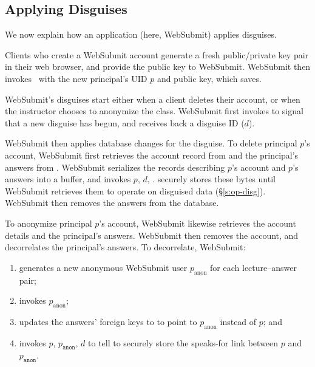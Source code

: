 \subsection{Applying Disguises}
%
We now explain how an application (here, WebSubmit) applies disguises.
%

%
Clients who create a WebSubmit account generate a fresh public/private key pair
in their web browser, and provide the public key to WebSubmit.
%
WebSubmit then invokes  with the new principal's UID $p$
and public key, which \sys saves.
%

%
WebSubmit's disguises start either when a client deletes their account,
or when the instructor chooses to anonymize the class.
%
WebSubmit first invokes  to signal \sys that a new
disguise has begun, and receives back a disguise ID ($d$).
%

%
WebSubmit then applies database changes for the disguise.
%
To delete principal $p$'s account, WebSubmit first retrieves the account record
from  and the principal's answers from .
%
WebSubmit serializes the records describing $p$'s account and $p$'s answers into
a buffer, and invokes $p$, $d$, .
%
\sys securely stores these bytes until WebSubmit retrieves them to operate on
disguised data (\S\ref{s:op-disg}).
%
WebSubmit then removes the answers from the database.
%

%
To anonymize principal $p$'s account, WebSubmit likewise retrieves the account
details and the principal's answers.
%
WebSubmit then removes the account, and decorrelates the principal's answers.
%
To decorrelate, WebSubmit:
%
\begin{enumerate}[nosep]
%
\item generates a new anonymous WebSubmit user $p_{\textrm{anon}}$ for each
  lecture--answer pair;
%
\item invokes $p_{\textrm{anon}}$\fn{)};
%
\item updates the answers' foreign keys to  to point to
  $p_{\textrm{anon}}$ instead of $p$; and
%
\item invokes $p$, $p_{\texttt{anon}}$, $d$\fn{)} to tell
    \sys to securely store the speaks-for link between $p$ and $p_{\texttt{anon}}$.
\end{enumerate}
%

